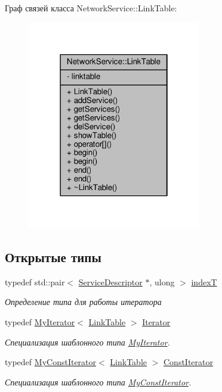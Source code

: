 Граф связей класса Network\+Service\+:\+:Link\+Table\+:\nopagebreak
\begin{figure}[H]
\begin{center}
\leavevmode
\includegraphics[width=214pt]{class_network_service_1_1_link_table__coll__graph}
\end{center}
\end{figure}
\subsection*{Открытые типы}
\begin{DoxyCompactItemize}
\item 
typedef std\+::pair$<$ \hyperlink{class_network_service_1_1_service_descriptor}{Service\+Descriptor} $\ast$, ulong $>$ \hyperlink{class_network_service_1_1_link_table_a5a0e870806128a79b9947a7ea496fe9e}{index\+T}
\begin{DoxyCompactList}\small\item\em Определение типа для работы итератора \end{DoxyCompactList}\item 
typedef \hyperlink{class_network_service_1_1_my_iterator}{My\+Iterator}$<$ \hyperlink{class_network_service_1_1_link_table}{Link\+Table} $>$ \hyperlink{class_network_service_1_1_link_table_a699ed11fe42478b5269f8c44f7354c77}{Iterator}
\begin{DoxyCompactList}\small\item\em Специализация шаблонного типа \hyperlink{class_network_service_1_1_my_iterator}{My\+Iterator}. \end{DoxyCompactList}\item 
typedef \hyperlink{class_network_service_1_1_my_const_iterator}{My\+Const\+Iterator}$<$ \hyperlink{class_network_service_1_1_link_table}{Link\+Table} $>$ \hyperlink{class_network_service_1_1_link_table_a2414daadb1745ec3039bba9810c8a23d}{Const\+Iterator}
\begin{DoxyCompactList}\small\item\em Специализация шаблонного типа \hyperlink{class_network_service_1_1_my_const_iterator}{My\+Const\+Iterator}. \end{DoxyCompactList}\end{DoxyCompactItemize}
